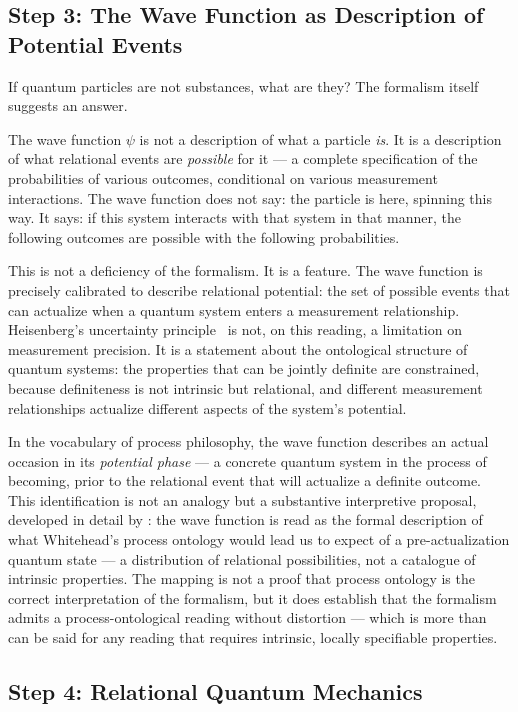 \subsection{Step 3: The Wave Function as Description of Potential Events}

If quantum particles are not substances, what are they?
The formalism itself suggests an answer.

The wave function $\psi$ is not a description of what a particle \emph{is}.
It is a description of what relational events are \emph{possible} for it ---
a complete specification of the probabilities of various outcomes, conditional
on various measurement interactions.
The wave function does not say: the particle is here, spinning this way.
It says: if this system interacts with that system in that manner, the
following outcomes are possible with the following probabilities.

This is not a deficiency of the formalism.
It is a feature.
The wave function is precisely calibrated to describe relational potential:
the set of possible events that can actualize when a quantum system enters
a measurement relationship.
Heisenberg's uncertainty principle~\citeyearpar{Heisenberg1927} is not,
on this reading, a limitation on measurement precision.
It is a statement about the ontological structure of quantum systems:
the properties that can be jointly definite are constrained, because
definiteness is not intrinsic but relational, and different measurement
relationships actualize different aspects of the system's potential.

In the vocabulary of process philosophy, the wave function describes an
actual occasion in its \emph{potential phase} --- a concrete quantum system
in the process of becoming, prior to the relational event that will actualize
a definite outcome.
This identification is not an analogy but a substantive interpretive
proposal, developed in detail by \citet{Epperson2004}: the wave function
is read as the formal description of what Whitehead's process ontology
would lead us to expect of a pre-actualization quantum state --- a
distribution of relational possibilities, not a catalogue of intrinsic
properties.
The mapping is not a proof that process ontology is the correct
interpretation of the formalism, but it does establish that the formalism
admits a process-ontological reading without distortion --- which is more
than can be said for any reading that requires intrinsic, locally
specifiable properties.

\subsection{Step 4: Relational Quantum Mechanics}

